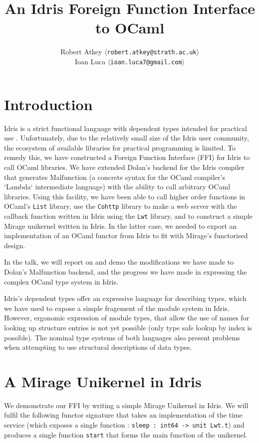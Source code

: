\documentclass[a4paper,10pt,twocolumn]{article}
\title{An Idris Foreign Function Interface to OCaml}
\author{Robert Atkey  $\langle$\texttt{robert.atkey@strath.ac.uk}$\rangle$ \\
  Ioan Luca $\langle$\texttt{ioan.luca7@gmail.com}$\rangle$}
\date{}
\begin{document}
\maketitle

\section{Introduction}

Idris is a strict functional language with dependent types intended
for practical use \cite{tdd}. Unfortunately, due to the
relatively small size of the Idris user community, the ecosystem of
available libraries for practical programming is limited. To remedy
this, we have constructed a Foreign Function Interface (FFI) for Idris
to call OCaml libraries. We have extended Dolan's backend
\cite{dolan2016malfunctional} for the Idris compiler that generates
Malfunction (a concrete syntax for the OCaml compiler's `Lambda`
intermediate language) with the ability to call arbitrary OCaml
libraries. Using this facility, we have been able to call higher order
functions in OCaml's \texttt{List} library, use the \texttt{Cohttp}
library to make a web server with the callback function written in
Idris using the \texttt{Lwt} library, and to construct a simple Mirage
unikernel written in Idris. In the latter case, we needed to export an
implementation of an OCaml functor from Idris to fit with Mirage's
functorised design.

In the talk, we will report on and demo the modifications we have made
to Dolan's Malfunction backend, and the progress we have made in
expressing the complex OCaml type system in Idris.

Idris's dependent types offer an expressive language for describing
types, which we have used to expose a simple fragement of the module
system in Idris.  However, ergonomic expression of module types, that
allow the use of names for looking up structure entries is not yet
possible (only type safe lookup by index is possible). The nominal
type systems of both languages also present problems when attempting
to use structural descriptions of data types.

\section{A Mirage Unikernel in Idris}

We demonstrate our FFI by writing a simple Mirage Unikernel in
Idris. We will fulfil the following functor signature that takes an
implementation of the time service (which exposes a single function :
\texttt{sleep : int64 -> unit Lwt.t}) and produces a single function
\texttt{start} that forms the main function of the unikernel.
\end{document}
